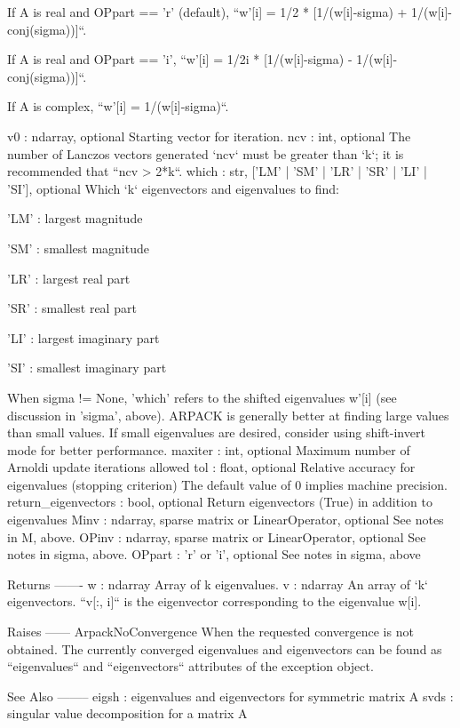 \begin{DoxyVerb}
        If A is real and OPpart == 'r' (default),
          ``w'[i] = 1/2 * [1/(w[i]-sigma) + 1/(w[i]-conj(sigma))]``.

        If A is real and OPpart == 'i',
          ``w'[i] = 1/2i * [1/(w[i]-sigma) - 1/(w[i]-conj(sigma))]``.

        If A is complex, ``w'[i] = 1/(w[i]-sigma)``.

v0 : ndarray, optional
    Starting vector for iteration.
ncv : int, optional
    The number of Lanczos vectors generated
    `ncv` must be greater than `k`; it is recommended that ``ncv > 2*k``.
which : str, ['LM' | 'SM' | 'LR' | 'SR' | 'LI' | 'SI'], optional
    Which `k` eigenvectors and eigenvalues to find:

        'LM' : largest magnitude

        'SM' : smallest magnitude

        'LR' : largest real part

        'SR' : smallest real part

        'LI' : largest imaginary part

        'SI' : smallest imaginary part

    When sigma != None, 'which' refers to the shifted eigenvalues w'[i]
    (see discussion in 'sigma', above).  ARPACK is generally better
    at finding large values than small values.  If small eigenvalues are
    desired, consider using shift-invert mode for better performance.
maxiter : int, optional
    Maximum number of Arnoldi update iterations allowed
tol : float, optional
    Relative accuracy for eigenvalues (stopping criterion)
    The default value of 0 implies machine precision.
return_eigenvectors : bool, optional
    Return eigenvectors (True) in addition to eigenvalues
Minv : ndarray, sparse matrix or LinearOperator, optional
    See notes in M, above.
OPinv : ndarray, sparse matrix or LinearOperator, optional
    See notes in sigma, above.
OPpart : {'r' or 'i'}, optional
    See notes in sigma, above

Returns
-------
w : ndarray
    Array of k eigenvalues.
v : ndarray
    An array of `k` eigenvectors.
    ``v[:, i]`` is the eigenvector corresponding to the eigenvalue w[i].

Raises
------
ArpackNoConvergence
    When the requested convergence is not obtained.
    The currently converged eigenvalues and eigenvectors can be found
    as ``eigenvalues`` and ``eigenvectors`` attributes of the exception
    object.

See Also
--------
eigsh : eigenvalues and eigenvectors for symmetric matrix A
svds : singular value decomposition for a matrix A


\end{DoxyVerb}
